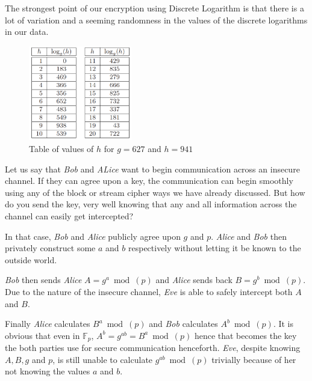 		The strongest point of our encryption using Discrete Logarithm is that there is a lot of variation and a seeming randomness in the values of the discrete logarithms in our data.
		\begin{figure}
			\caption{Table of values of \(h\) for \(g = 627\) and \(h= 941\)}
			\includegraphics[width=0.4\textwidth]{Photos/Discrete_log_1.png}
		\end{figure}

		Let us say that \emph{Bob} and \emph{ALice} want to begin communication across an insecure channel. If they can agree upon a key, the communication can begin smoothly using any of the block or stream cipher ways we have already discussed. But how do you send the key, very well knowing that any and all information across the channel can easily get intercepted? \par
		In that case, \emph{Bob} and \emph{Alice} publicly agree upon \(g\) and \(p\). \emph{Alice} and \emph{Bob} then privately construct some \(a\) and \(b\) respectively without letting it be known to the outside world. \par
		\emph{Bob} then sends \emph{Alice} \(A = g^a \bmod(p)\) and \emph{Alice} sends back \(B = g^b \bmod(p)\). Due to the nature of the insecure channel, \emph{Eve} is able to safely intercept both \(A\) and \(B\). \par
		Finally \emph{Alice} calculates \(B^a \bmod(p)\) and \emph{Bob} calculates \(A^b \bmod(p)\). It is obvious that even in \(\mathbb{F}_p\), \(A^b = g^{ab} = B^a \bmod(p)\) hence that becomes the key the both parties use for secure communication henceforth.
		\emph{Eve}, despite knowing \(A, B, g\) and \(p\), is still unable to calculate \(g^{ab} \bmod(p)\) trivially because of her not knowing the values \(a\) and \(b\).

